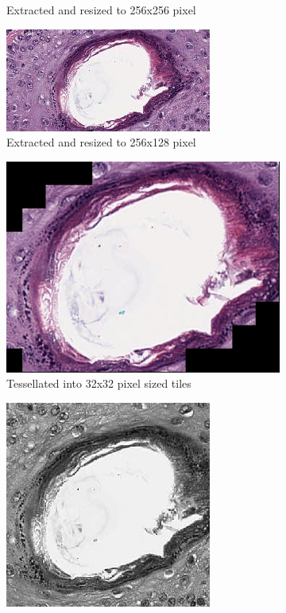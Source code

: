 \begin{figure}[H]
\begin{subfigure}{.5\textwidth}
		\caption{Extracted and resized to 256x256 pixel}
		\label{subfig5:a2}
	\end{subfigure}
	\begin{subfigure}{.5\textwidth}
		\centering
		\includegraphics[width=.8\linewidth]{img/ts_test/1_r128.jpeg}
		\caption{Extracted and resized to 256x128 pixel}
		\label{subfig5:a3}
	\end{subfigure}
	\begin{subfigure}{.5\textwidth}
		\centering
		\includegraphics[width=.8\linewidth]{img/ts_test/1_stitched.jpeg}
		\caption{Tessellated into 32x32 pixel sized tiles}
		\label{subfig5:a4}
	\end{subfigure}
	\begin{subfigure}{.5\textwidth}
		\centering
		\includegraphics[width=.8\linewidth]{img/ts_test/1_g.jpeg}

\end{subfigure}
\end{figure}
